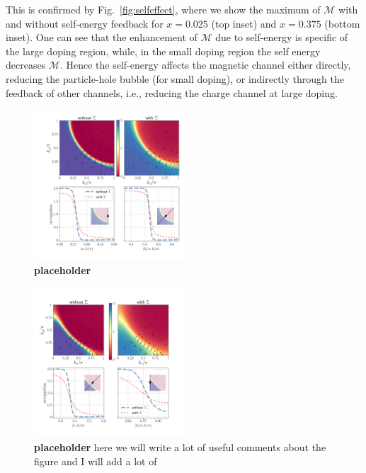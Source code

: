 This is confirmed by Fig.~\ref{fig:selfeffect}, where we show the maximum of $\mathcal{M}$ with and without self-energy feedback for $x=0.025$ (top inset) and $x=0.375$ (bottom inset).  
One can see that the enhancement of $\mathcal{M}$ due to self-energy is specific of the large doping region, while, in the small doping region the self energy decreases $\mathcal{M}$.  
Hence the self-energy affects the magnetic channel either directly, reducing the particle-hole bubble (for small doping), or indirectly through the feedback of other channels, i.e., reducing the charge channel at large doping. 


\begin{figure}
\includegraphics[width=0.5\textwidth]{images/occupations_0975.png}
\caption{\textbf{placeholder}} 
\label{fig:occ600}
\end{figure}

\begin{figure}
\includegraphics[width=0.5\textwidth]{images/occupations_0600.png}
\caption{\textbf{placeholder} here we will write a lot of useful comments about the figure and I will add a lot of } 
\label{fig:occ975}
\end{figure}


